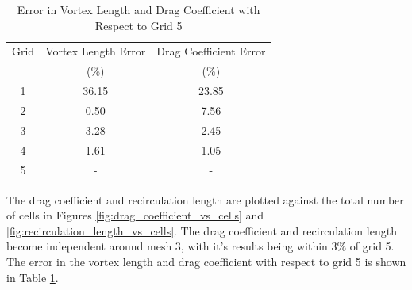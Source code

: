\begin{table}[H]
    \centering
    \caption{Error in Vortex Length and Drag Coefficient with Respect to Grid 5}
    \label{tab:error_vortex_length_drag_coefficient}
    \begin{tabular}{ccc}
        \toprule
        Grid & Vortex Length Error & Drag Coefficient Error \\
        & (\%) & (\%) \\
        \midrule
        1 & 36.15 & 23.85 \\
        2 & 0.50 & 7.56 \\
        3 & 3.28 & 2.45 \\
        4 & 1.61 & 1.05 \\
        5 & - & - \\
        \bottomrule
    \end{tabular}
\end{table}
The drag coefficient and recirculation length are plotted against the total number of cells in Figures \ref{fig:drag_coefficient_vs_cells} and \ref{fig:recirculation_length_vs_cells}. The drag coefficient and recirculation length become independent around mesh 3, with it's results being within 3\% of grid 5. The error in the vortex length and drag coefficient with respect to grid 5 is shown in Table \ref{tab:error_vortex_length_drag_coefficient}.



